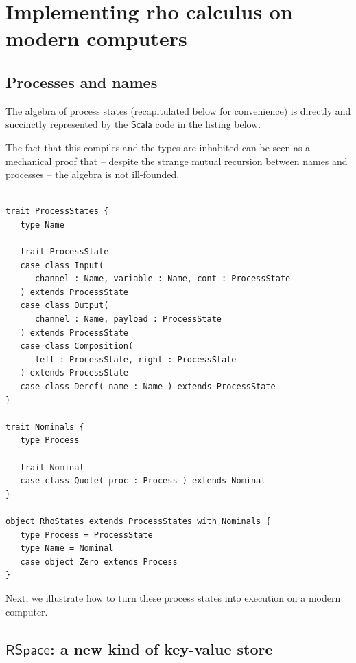 \section{Implementing rho calculus on modern computers}

\subsection{Processes and names}
The algebra of process states (recapitulated below for convenience) is
directly and succinctly represented by the $\mathsf{Scala}$ code in
the listing below.


The fact that this compiles and the types are inhabited can be seen as
a mechanical proof that -- despite the strange mutual recursion
between names and processes -- the algebra is not ill-founded. \\
\\

\begin{lstlisting}
trait ProcessStates {
   type Name

   trait ProcessState
   case class Input(
      channel : Name, variable : Name, cont : ProcessState
   ) extends ProcessState
   case class Output(
      channel : Name, payload : ProcessState
   ) extends ProcessState
   case class Composition(
      left : ProcessState, right : ProcessState
   ) extends ProcessState
   case class Deref( name : Name ) extends ProcessState
}

trait Nominals {
   type Process

   trait Nominal
   case class Quote( proc : Process ) extends Nominal
}

object RhoStates extends ProcessStates with Nominals {
   type Process = ProcessState
   type Name = Nominal
   case object Zero extends Process
}
\end{lstlisting}

Next, we illustrate how to turn these process states into execution on
a modern computer.

\subsection{$\mathsf{RSpace}$: a new kind of key-value store}

